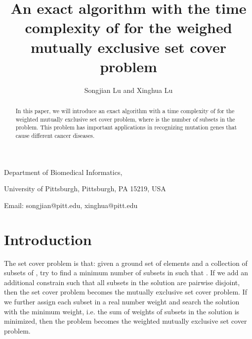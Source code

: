 \documentclass[11pt]{article}
\begin{document}
\title{An exact algorithm with the time complexity of   for the weighed mutually exclusive set cover problem}

\author{Songjian Lu and Xinghua Lu}

\date{}

\maketitle

\vspace{-0.8cm}
\begin{center} Department of Biomedical Informatics,

University of Pittsburgh, Pittsburgh, PA 15219, USA

Email: songjian@pitt.edu, xinghua@pitt.edu
\end{center}



\begin{abstract}
In this paper, we will introduce an exact algorithm with a time
complexity of 
\let\thefootnote\relax{} for the {\sc
weighted mutually exclusive set cover} problem, where  is the
number of subsets in the problem. This problem has important
applications in recognizing mutation genes that cause different
cancer diseases.
\end{abstract}


\section{Introduction}
The {\sc set cover} problem is that: given a ground set  of 
elements and a collection  of  subsets of , try to
find a minimum number of subsets  in  such that . If we add an additional
constrain such that all subsets in the solution are pairwise
disjoint, then the {\sc set cover} problem becomes the {\sc
mutually exclusive set cover} problem. If we further assign each
subset in  a real number weight and search the solution
with the minimum weight, i.e. the sum of weights of subsets in the
solution is minimized, then the problem becomes the {\sc weighted
mutually exclusive set cover} problem.
\end{document}
